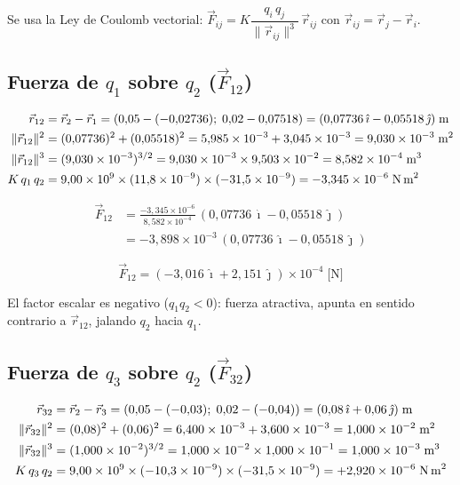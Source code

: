 \documentclass[12pt,letterpaper]{article}
\begin{document}
Se usa la Ley de Coulomb vectorial: $\vec{F}_{ij} = K\dfrac{q_i\,q_j}{\|\vec{r}_{ij}\|^3}\,\vec{r}_{ij}$
con $\vec{r}_{ij} = \vec{r}_j - \vec{r}_i$.

\subsection*{Fuerza de $q_1$ sobre $q_2$ \;($\vec{F}_{12}$)}

\begin{align*}
    \vec{r}_{12} &= \vec{r}_2-\vec{r}_1
                   = (0{,}05-(-0{,}02736);\;0{,}02-0{,}07518)
                   = (0{,}07736\,\hat{\imath}-0{,}05518\,\hat{\jmath})\;\text{m}\\
    \|\vec{r}_{12}\|^2 &= (0{,}07736)^2+(0{,}05518)^2
                         = 5{,}985\times10^{-3}+3{,}045\times10^{-3} = 9{,}030\times10^{-3}\;\text{m}^2\\
    \|\vec{r}_{12}\|^3 &= (9{,}030\times10^{-3})^{3/2}
                         = 9{,}030\times10^{-3}\times9{,}503\times10^{-2} = 8{,}582\times10^{-4}\;\text{m}^3\\
    K\,q_1\,q_2 &= 9{,}00\times10^9\times(11{,}8\times10^{-9})\times(-31{,}5\times10^{-9})
                 = -3{,}345\times10^{-6}\;\text{N\,m}^2
\end{align*}

\begin{align*}
    \vec{F}_{12}
    &= \frac{-3{,}345\times10^{-6}}{8{,}582\times10^{-4}}
       \,(0{,}07736\,\hat{\imath}-0{,}05518\,\hat{\jmath})\\
    &= -3{,}898\times10^{-3}\,(0{,}07736\,\hat{\imath}-0{,}05518\,\hat{\jmath})
\end{align*}

\begin{equation*}
    \boxed{\vec{F}_{12} = (-3{,}016\,\hat{\imath}+2{,}151\,\hat{\jmath})\times10^{-4}\;\text{[N]}}
\end{equation*}

El factor escalar es negativo ($q_1 q_2 < 0$): fuerza atractiva, apunta en sentido contrario a
$\vec{r}_{12}$, jalando $q_2$ hacia $q_1$.

\subsection*{Fuerza de $q_3$ sobre $q_2$ \;($\vec{F}_{32}$)}

\begin{align*}
    \vec{r}_{32} &= \vec{r}_2-\vec{r}_3
                   = (0{,}05-(-0{,}03);\;0{,}02-(-0{,}04))
                   = (0{,}08\,\hat{\imath}+0{,}06\,\hat{\jmath})\;\text{m}\\
    \|\vec{r}_{32}\|^2 &= (0{,}08)^2+(0{,}06)^2
                         = 6{,}400\times10^{-3}+3{,}600\times10^{-3} = 1{,}000\times10^{-2}\;\text{m}^2\\
    \|\vec{r}_{32}\|^3 &= (1{,}000\times10^{-2})^{3/2}
                         = 1{,}000\times10^{-2}\times1{,}000\times10^{-1} = 1{,}000\times10^{-3}\;\text{m}^3\\
    K\,q_3\,q_2 &= 9{,}00\times10^9\times(-10{,}3\times10^{-9})\times(-31{,}5\times10^{-9})
                 = +2{,}920\times10^{-6}\;\text{N\,m}^2
\end{align*}
\end{document}
